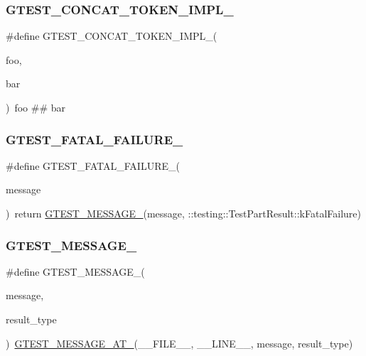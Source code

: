\subsubsection{\texorpdfstring{GTEST\_CONCAT\_TOKEN\_IMPL\_}{GTEST\_CONCAT\_TOKEN\_IMPL\_}}
{\footnotesize\ttfamily \#define G\+T\+E\+S\+T\+\_\+\+C\+O\+N\+C\+A\+T\+\_\+\+T\+O\+K\+E\+N\+\_\+\+I\+M\+P\+L\+\_\+(\begin{DoxyParamCaption}\item[{}]{foo,  }\item[{}]{bar }\end{DoxyParamCaption})~foo \#\# bar}

\mbox{\label{googletest-master_2googletest_2include_2gtest_2internal_2gtest-internal_8h_a0f9a4c3ea82cc7bf4478eaffdc168358}} 
\subsubsection{\texorpdfstring{GTEST\_FATAL\_FAILURE\_}{GTEST\_FATAL\_FAILURE\_}}
{\footnotesize\ttfamily \#define G\+T\+E\+S\+T\+\_\+\+F\+A\+T\+A\+L\+\_\+\+F\+A\+I\+L\+U\+R\+E\+\_\+(\begin{DoxyParamCaption}\item[{}]{message }\end{DoxyParamCaption})~return \mbox{\hyperlink{_obj__test_2lib_2googletest-release-1_88_81_2googletest_2include_2gtest_2internal_2gtest-internal_8h_a94c73d5368ec946bc354d0992ad00810}{G\+T\+E\+S\+T\+\_\+\+M\+E\+S\+S\+A\+G\+E\+\_\+}}(message, \+::testing\+::\+Test\+Part\+Result\+::k\+Fatal\+Failure)}

\mbox{\label{googletest-master_2googletest_2include_2gtest_2internal_2gtest-internal_8h_a94c73d5368ec946bc354d0992ad00810}} 
\subsubsection{\texorpdfstring{GTEST\_MESSAGE\_}{GTEST\_MESSAGE\_}}
{\footnotesize\ttfamily \#define G\+T\+E\+S\+T\+\_\+\+M\+E\+S\+S\+A\+G\+E\+\_\+(\begin{DoxyParamCaption}\item[{}]{message,  }\item[{}]{result\+\_\+type }\end{DoxyParamCaption})~\mbox{\hyperlink{_obj__test_2lib_2googletest-release-1_88_81_2googletest_2include_2gtest_2internal_2gtest-internal_8h_a8d70025c45a47a493780746dfd66d565}{G\+T\+E\+S\+T\+\_\+\+M\+E\+S\+S\+A\+G\+E\+\_\+\+A\+T\+\_\+}}(\+\_\+\+\_\+\+F\+I\+L\+E\+\_\+\+\_\+, \+\_\+\+\_\+\+L\+I\+N\+E\+\_\+\+\_\+, message, result\+\_\+type)}

